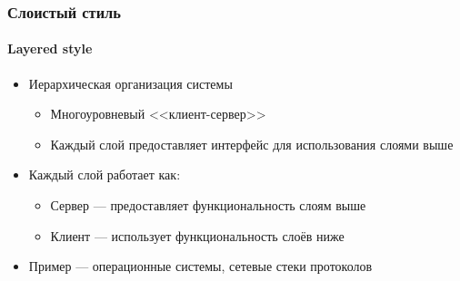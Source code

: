\documentclass{../../slides-style}
\begin{document}
    \begin{frame}
        \frametitle{Слоистый стиль}
        \framesubtitle{Layered style}
        \begin{itemize}
            \item Иерархическая организация системы
            \begin{itemize}
                \item Многоуровневый <<клиент-сервер>>
                \item Каждый слой предоставляет интерфейс для использования слоями выше
            \end{itemize}
            \item Каждый слой работает как:
            \begin{itemize}
                \item Сервер --- предоставляет функциональность слоям выше
                \item Клиент --- использует функциональность слоёв ниже
            \end{itemize}
            \item Пример --- операционные системы, сетевые стеки протоколов
        \end{itemize}
    \end{frame}
\end{document}
